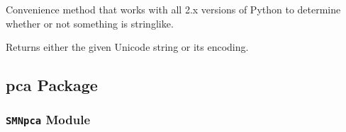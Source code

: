 \documentclass[letterpaper,10pt,english]{sphinxmanual}
\begin{document}

\begin{fulllineitems}
\label{SamPy.parsing:SamPy.parsing.BeautifulSoup.isString}
Convenience method that works with all 2.x versions of Python
to determine whether or not something is stringlike.

\end{fulllineitems}



\begin{fulllineitems}
\label{SamPy.parsing:SamPy.parsing.BeautifulSoup.sob}
Returns either the given Unicode string or its encoding.

\end{fulllineitems}



\subsection{pca Package}
\label{SamPy.pca:pca-package}\label{SamPy.pca::doc}

\subsubsection{\texttt{SMNpca} Module}
\label{SamPy.pca:module-SamPy.pca.SMNpca}\label{SamPy.pca:smnpca-module}
\end{document}
